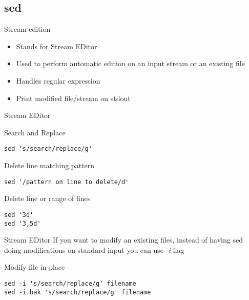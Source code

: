 \subsection{sed}

\begin{frame}[fragile]{Stream edition}
  \begin{itemize}
    \item Stands for Stream EDitor
    \pause
    \item Used to perform automatic edition on an input stream or an existing file
    \pause
    \item Handles regular expression
    \pause
    \item Print modified file/stream on stdout
  \end{itemize}
\end{frame}

\begin{frame}[fragile]{Stream EDitor}
  \begin{exampleblock}{Search and Replace}
    \begin{lstlisting}[showstringspaces=false,basicstyle=\tiny]
sed 's/search/replace/g'
    \end{lstlisting}
  \end{exampleblock}
  \pause

  \begin{exampleblock}{Delete line matching pattern}
    \begin{lstlisting}[showstringspaces=false,basicstyle=\tiny]
sed '/pattern on line to delete/d'
    \end{lstlisting}
  \end{exampleblock}
  \pause

  \begin{exampleblock}{Delete line or range of lines}
    \begin{lstlisting}[showstringspaces=false,basicstyle=\tiny]
sed '3d'
sed '3,5d'
    \end{lstlisting}
  \end{exampleblock}
\end{frame}

\begin{frame}[fragile]{Stream EDitor}
If you want to modify an existing files, instead of having sed doing modifications on standard input you can use \emph{-i} flag
\pause
  \begin{exampleblock}{Modify file in-place}
    \begin{lstlisting}[showstringspaces=false,basicstyle=\tiny]
sed -i 's/search/replace/g' filename
sed -i.bak 's/search/replace/g' filename
    \end{lstlisting}
  \end{exampleblock}
\end{frame}

